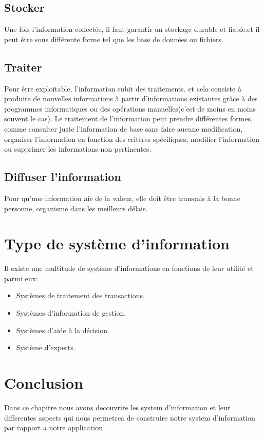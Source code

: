 \subsection{Stocker }
\par Une fois l’information collectée, il faut garantir un stockage durable et
fiable.et il peut être sous différente forme tel que les base de données ou
fichiers.\cite{ref13}

\subsection{Traiter }
\par Pour être exploitable, l’information subit des traitements. et cela
consiste à produire de nouvelles informations à partir d’informations
existantes grâce à des programmes informatiques ou des opérations
manuelles(c’est de moins en moins souvent le cas).
Le traitement de l’information peut prendre différentes formes, comme consulter
juste l’information de base sans faire aucune modification, organiser
l’information en fonction des critères spécifiques, modifier l’information ou
supprimer les informations non pertinentes.\cite{ref13}

\subsection{Diffuser l'information }
\par Pour qu’une information aie de la valeur, elle doit être transmis à la
bonne personne, organisme dans les meilleurs délais. 
\section{Type de système d'information }
\par Il existe une multitude de système d’informations en fonctions de leur 
utilité et parmi eux:
\begin{itemize}[label=\textbullet]
    \item Systèmes de traitement des transactions.
    \item Systèmes d'information de gestion.
    \item Systèmes d'aide à la décision.
    \item Système d'experts.\cite{ref14}
\end{itemize}




\section{Conclusion }

\par Dans ce chapitre nous avons decouvrire les system d'information et leur
differentes aspects qui nous permetrea de construire notre system d'information
par rapport a notre application
